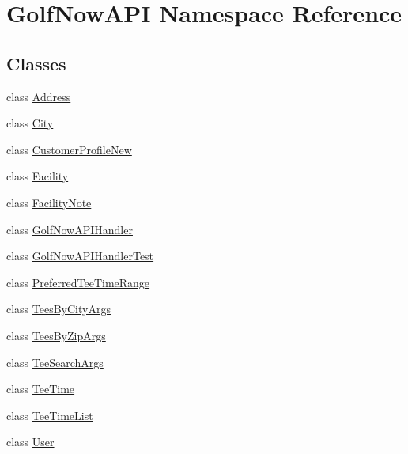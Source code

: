\hypertarget{namespace_golf_now_a_p_i}{}\section{Golf\+Now\+A\+PI Namespace Reference}
\label{namespace_golf_now_a_p_i}
\subsection*{Classes}
\begin{DoxyCompactItemize}
\item 
class \mbox{\hyperlink{class_golf_now_a_p_i_1_1_address}{Address}}
\item 
class \mbox{\hyperlink{class_golf_now_a_p_i_1_1_city}{City}}
\item 
class \mbox{\hyperlink{class_golf_now_a_p_i_1_1_customer_profile_new}{Customer\+Profile\+New}}
\item 
class \mbox{\hyperlink{class_golf_now_a_p_i_1_1_facility}{Facility}}
\item 
class \mbox{\hyperlink{class_golf_now_a_p_i_1_1_facility_note}{Facility\+Note}}
\item 
class \mbox{\hyperlink{class_golf_now_a_p_i_1_1_golf_now_a_p_i_handler}{Golf\+Now\+A\+P\+I\+Handler}}
\item 
class \mbox{\hyperlink{class_golf_now_a_p_i_1_1_golf_now_a_p_i_handler_test}{Golf\+Now\+A\+P\+I\+Handler\+Test}}
\item 
class \mbox{\hyperlink{class_golf_now_a_p_i_1_1_preferred_tee_time_range}{Preferred\+Tee\+Time\+Range}}
\item 
class \mbox{\hyperlink{class_golf_now_a_p_i_1_1_tees_by_city_args}{Tees\+By\+City\+Args}}
\item 
class \mbox{\hyperlink{class_golf_now_a_p_i_1_1_tees_by_zip_args}{Tees\+By\+Zip\+Args}}
\item 
class \mbox{\hyperlink{class_golf_now_a_p_i_1_1_tee_search_args}{Tee\+Search\+Args}}
\item 
class \mbox{\hyperlink{class_golf_now_a_p_i_1_1_tee_time}{Tee\+Time}}
\item 
class \mbox{\hyperlink{class_golf_now_a_p_i_1_1_tee_time_list}{Tee\+Time\+List}}
\item 
class \mbox{\hyperlink{class_golf_now_a_p_i_1_1_user}{User}}
\end{DoxyCompactItemize}
